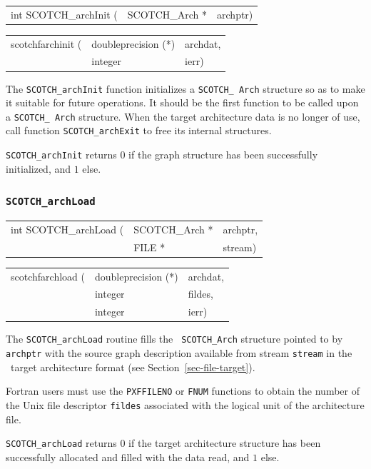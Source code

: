 \begin{itemize}
\progsyn

{\tt\begin{tabular}{l@{}ll}
int SCOTCH\_archInit ( & SCOTCH\_Arch * & archptr)
\end{tabular}}

{\tt\begin{tabular}{l@{}ll}
scotchfarchinit ( & doubleprecision (*) & archdat, \\
                  & integer             & ierr)
\end{tabular}}

\progdes

The {\tt SCOTCH\_archInit} function initializes a {\tt SCOTCH\_\lbt
Arch} structure so as to make it suitable for future operations. It
should be the first function to be called upon a {\tt SCOTCH\_\lbt
Arch} structure.  When the target architecture data is no longer of
use, call function {\tt SCOTCH\_\lbt archExit} to free its internal
structures.

\progret

{\tt SCOTCH\_archInit} returns $0$ if the graph structure has been
successfully initialized, and $1$ else.
\end{itemize}

\subsubsection{{\tt SCOTCH\_archLoad}}

\begin{itemize}
\progsyn

{\tt\begin{tabular}{l@{}ll}
int SCOTCH\_archLoad ( & SCOTCH\_Arch * & archptr, \\
                       & FILE *         & stream)
\end{tabular}}

{\tt\begin{tabular}{l@{}ll}
scotchfarchload ( & doubleprecision (*) & archdat, \\
                  & integer             & fildes, \\
                  & integer             & ierr)
\end{tabular}}

\progdes

The {\tt SCOTCH\_archLoad} routine fills the {\tt
SCOTCH\_\lbt Arch} structure pointed to by {\tt archptr} with the
source graph description available from stream {\tt stream} in the
\scotch\ target architecture format (see
Section~\ref{sec-file-target}).

Fortran users must use the {\tt PXFFILENO} or {\tt FNUM} functions to
obtain the number of the Unix file descriptor {\tt fildes} associated
with the logical unit of the architecture file.

\progret

{\tt SCOTCH\_archLoad} returns $0$ if the target architecture structure
has been successfully allocated and filled with the data read, and $1$
else.
\end{itemize}

